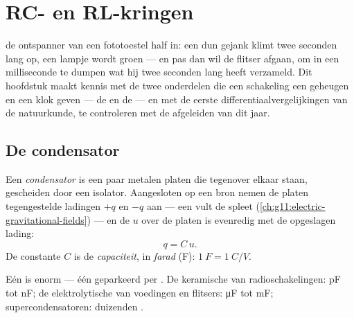 \chapter{RC- en RL-kringen}\label{ch:g12:rc-rl-circuits}

 de ontspanner van een fototoestel half in: een dun gejank klimt twee
seconden lang op, een lampje wordt groen --- en pas dan wil de flitser
afgaan, om in een milliseconde te dumpen wat hij twee seconden lang heeft
verzameld. Dit hoofdstuk maakt kennis met de twee onderdelen die een
schakeling een geheugen en een klok geven --- de  en de  ---
en met de eerste differentiaalvergelijkingen van de natuurkunde, te
controleren met de afgeleiden van dit jaar.

\section{De condensator}

\begin{definition}\label{def:g12:rc-rl-circuits:capacitor}
Een \emph{condensator} is een paar metalen platen die
tegenover elkaar staan, gescheiden door een  isolator. Aangesloten op een
bron nemen de platen tegengestelde ladingen $+q$ en $-q$ aan --- een
 vult de spleet
(\cref{ch:g11:electric-gravitational-fields}) --- en de  $u$ over de
platen is evenredig met de opgeslagen lading:
\[ q = C\,u . \]
De constante $C$ is de \emph{capaciteit}, in
\emph{farad} (\unit{F}): $\qty{1}{F} = \qty{1}{C/V}$.
\end{definition}

\begin{example}[Ordegrootten]\label{ex:g12:rc-rl-circuits:orders}
Eén  is enorm --- één  geparkeerd per . De keramische
 van radioschakelingen: \unit{pF} tot \unit{nF}; de
elektrolytische van voedingen en flitsers: \unit{\micro F} tot \unit{mF};
supercondensatoren: duizenden .
\end{example}

